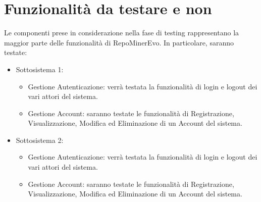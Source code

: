\chapter{Funzionalità da testare e non}
Le componenti prese in considerazione nella fase di testing  rappresentano la maggior parte delle funzionalità di RepoMinerEvo. In particolare, saranno testate:\\

\begin{itemize}

\item Sottosistema 1:
	\begin{itemize}
	\item Gestione Autenticazione: verrà testata la funzionalità di login e logout dei vari attori del sistema.
	\item Gestione Account: saranno testate le funzionalità di Registrazione, Visualizzazione, Modifica ed Eliminazione di un Account del sistema.
	\end{itemize}

\item Sottosistema 2:
	\begin{itemize}
	\item Gestione Autenticazione: verrà testata la funzionalità di login e logout dei vari attori del sistema.
	\item Gestione Account: saranno testate le funzionalità di Registrazione, Visualizzazione, Modifica ed Eliminazione di un Account del sistema.
	\end{itemize}

\end{itemize}